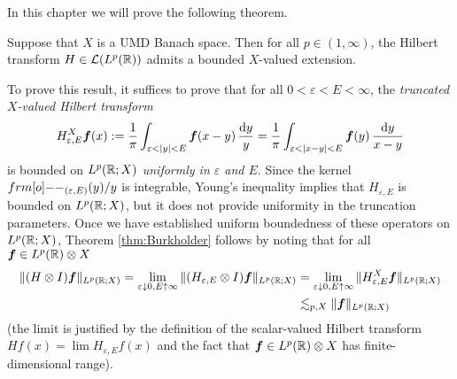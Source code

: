 In this chapter we will prove the following theorem.

\begin{thm}[Burkholder]\label{thm:Burkholder}
  Suppose that $X$ is a UMD Banach space.
  Then for all $p \in (1,\infty)$, the Hilbert transform $H \in \mathcal{L}(L^p(\mathbb{R}))$ admits a bounded $X$-valued extension.
\end{thm}

To prove this result, it suffices to prove that for all $0 < \varepsilon < E < \infty$, the \emph{truncated $X$-valued Hilbert transform}
\begin{equation*}
  H_{\varepsilon,E}^{X} \bm{f}(x) :=  \frac{1}{\pi} \int_{\varepsilon < |y| < E} \bm{f}(x-y) \, \frac{\mathrm{d} y}{y} = \frac{1}{\pi} \int_{\varepsilon < |x-y| < E} \bm{f}(y) \, \frac{\mathrm{d} y}{x-y}
\end{equation*}
is bounded on $L^p(\mathbb{R};X)$ \emph{uniformly in $\varepsilon$ and $E$}.
Since the kernel $\1_{(\varepsilon,E)}(y)/y$ is integrable, Young's inequality implies that $H_{\varepsilon,E}$ is bounded on $L^p(\mathbb{R};X)$, but it does not provide uniformity in the truncation parameters.
Once we have established uniform boundedness of these operators on $L^p(\mathbb{R};X)$, Theorem \ref{thm:Burkholder} follows by noting that for all $\bm{f} \in L^p(\mathbb{R}) \otimes X$
\begin{equation*}
  \begin{aligned}
    \|(H \otimes I)\bm{f}\|_{L^p(\mathbb{R};X)}
    = \lim_{\varepsilon \downarrow 0, E \uparrow \infty} \|(H_{\varepsilon,E} \otimes I)\bm{f}\|_{L^p(\mathbb{R};X)}
    &= \lim_{\varepsilon \downarrow 0, E \uparrow \infty} \|H_{\varepsilon,E}^{X}\bm{f}\|_{L^p(\mathbb{R};X)} \\
    &\lesssim_{p,X} \|\bm{f}\|_{L^p(\mathbb{R};X)}
  \end{aligned}
\end{equation*}
(the limit is justified by the definition of the scalar-valued Hilbert transform $Hf(x) = \lim H_{\varepsilon, E}f(x)$ and the fact that $\bm{f} \in L^p(\mathbb{R}) \otimes X$ has finite-dimensional range).

